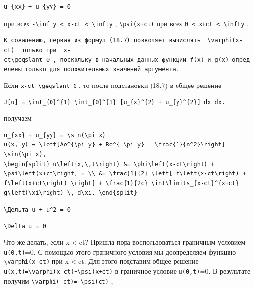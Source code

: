 \documentclass[
  ukrainian,
]{article}
\begin{document}
\begin{verbatim}
u_{xx} + u_{yy} = 0
\end{verbatim}

при всех
\texttt{-\textbackslash{}infty\ \textless{}\ x-ct\ \textless{}\ \textbackslash{}infty}
, \texttt{\textbackslash{}psi(x+ct)} при всех
\texttt{0\ \textless{}\ x+ct\ \textless{}\ \textbackslash{}infty} .

\texttt{К\ сожалению,\ первая\ из\ формул\ (18.7)\ позволяет\ вычислять\ \ \textquotesingle{}\textbackslash{}varphi(x-ct)\textquotesingle{}\ \ только\ при\ \ \textquotesingle{}x-ct\textbackslash{}geqslant\ 0\textquotesingle{}\ ,\ поскольку\ в\ начальных\ данных\ функции\ \textquotesingle{}f(x)\textquotesingle{}\ и\ \textquotesingle{}g(x)\textquotesingle{}\ определены\ только\ для\ положительных\ значений\ аргумента.}

Если \texttt{x-ct\ \textbackslash{}geqslant\ 0} , то после подстановки
(18.7) в общее решение

\begin{verbatim}
J[u] = \int_{0}^{1} \int_{0}^{1} [u_{x}^{2} + u_{y}^{2}] dx dx.
\end{verbatim}

получаем

\begin{verbatim}
u_{xx} + u_{yy} = \sin(\pi x)
u(x, y) = \left[Ae^{\pi y} + Be^{-\pi y} - \frac{1}{n^2}\right] \sin(\pi x),
\begin{split} u\left(x,\,t\right) &= \phi\left(x-ct\right) + \psi\left(x+ct\right) = \\ &= \frac{1}{2} \left[ f\left(x-ct\right) + f\left(x+ct\right) \right] + \frac{1}{2c} \int\limits_{x-ct}^{x+ct} g\left(\xi\right) \, d\xi. \end{split}
\end{verbatim}

\texttt{\textbackslash{}Дельта\ u\ +\ u\^{}2\ =\ 0}

\begin{verbatim}
\Delta u = 0
\end{verbatim}

Что же делать, если x \textless{} ct? Пришла пора воспользоваться
граничным условием \texttt{u(0,t)}=0. С помощью этого граничного условия
мы доопределяем функцию \texttt{\textbackslash{}varphi(x-ct)} при x
\textless{} ct. Для этого подставим общее решение
\texttt{u(x,t)=\textbackslash{}varphi(x-ct)+\textbackslash{}psi(x+ct)} в
граничное условие \texttt{u(0,t)}=0. В результате получим
\texttt{\textbackslash{}varphi(-ct)=-\textbackslash{}psi(ct)} ,
\end{document}

